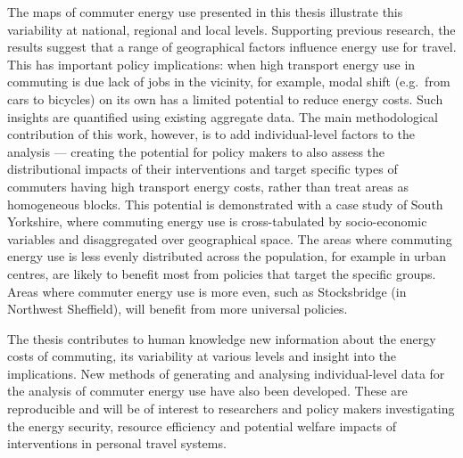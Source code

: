 \documentclass[a4paper, 11pt, twoside]{Thesis}  %
\begin{document}
{%
The maps of commuter energy use presented in this thesis
illustrate this variability at national, regional and local levels.
Supporting previous research, the results suggest that a
range of geographical factors influence energy use for travel.
This
has important policy implications: when high transport energy use in commuting
is due lack of jobs in
the vicinity, for example, modal shift (e.g.~from cars to bicycles)
on its own has a limited potential to reduce
energy costs. Such insights are quantified using existing aggregate data.
The main methodological contribution of this work, however, is to add
individual-level factors to
the analysis --- creating the potential for policy makers to also assess the
distributional
impacts of their interventions and target specific types of
commuters having high transport energy costs,
rather than treat areas as homogeneous blocks. This potential is
demonstrated with a case study of South
Yorkshire, where commuting energy use is cross-tabulated by
socio-economic variables and disaggregated over geographical space.
The areas where commuting energy use is less evenly distributed across the population, 
for example in urban centres, are
likely to benefit most from policies that target the specific groups.
Areas where commuter
energy use is more even, such as
Stocksbridge (in Northwest Sheffield), will benefit from more universal policies.


The thesis contributes to human knowledge new information about
the energy costs of commuting, its variability
at various levels and insight into the implications.
New methods of generating and analysing individual-level
data for the analysis of commuter energy use have also been developed.
These are reproducible and will be of interest
to researchers and policy makers investigating
the energy security, resource efficiency and potential welfare impacts
of interventions in personal travel systems.
}
\end{document}
